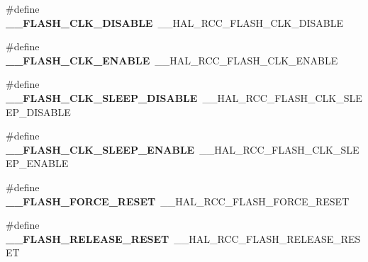 \begin{DoxyCompactItemize}
\item 
\#define {\bfseries \+\_\+\+\_\+\+F\+L\+A\+S\+H\+\_\+\+C\+L\+K\+\_\+\+D\+I\+S\+A\+B\+LE}~\+\_\+\+\_\+\+H\+A\+L\+\_\+\+R\+C\+C\+\_\+\+F\+L\+A\+S\+H\+\_\+\+C\+L\+K\+\_\+\+D\+I\+S\+A\+B\+LE\hypertarget{group___h_a_l___r_c_c___aliased_ga201486d4c60a085aae103a6e24686f79}{}\label{group___h_a_l___r_c_c___aliased_ga201486d4c60a085aae103a6e24686f79}

\item 
\#define {\bfseries \+\_\+\+\_\+\+F\+L\+A\+S\+H\+\_\+\+C\+L\+K\+\_\+\+E\+N\+A\+B\+LE}~\+\_\+\+\_\+\+H\+A\+L\+\_\+\+R\+C\+C\+\_\+\+F\+L\+A\+S\+H\+\_\+\+C\+L\+K\+\_\+\+E\+N\+A\+B\+LE\hypertarget{group___h_a_l___r_c_c___aliased_gaed751ca0ecff59ac600a0e37bb48595d}{}\label{group___h_a_l___r_c_c___aliased_gaed751ca0ecff59ac600a0e37bb48595d}

\item 
\#define {\bfseries \+\_\+\+\_\+\+F\+L\+A\+S\+H\+\_\+\+C\+L\+K\+\_\+\+S\+L\+E\+E\+P\+\_\+\+D\+I\+S\+A\+B\+LE}~\+\_\+\+\_\+\+H\+A\+L\+\_\+\+R\+C\+C\+\_\+\+F\+L\+A\+S\+H\+\_\+\+C\+L\+K\+\_\+\+S\+L\+E\+E\+P\+\_\+\+D\+I\+S\+A\+B\+LE\hypertarget{group___h_a_l___r_c_c___aliased_ga693fcefbe588aab88ed03b34cbd654a2}{}\label{group___h_a_l___r_c_c___aliased_ga693fcefbe588aab88ed03b34cbd654a2}

\item 
\#define {\bfseries \+\_\+\+\_\+\+F\+L\+A\+S\+H\+\_\+\+C\+L\+K\+\_\+\+S\+L\+E\+E\+P\+\_\+\+E\+N\+A\+B\+LE}~\+\_\+\+\_\+\+H\+A\+L\+\_\+\+R\+C\+C\+\_\+\+F\+L\+A\+S\+H\+\_\+\+C\+L\+K\+\_\+\+S\+L\+E\+E\+P\+\_\+\+E\+N\+A\+B\+LE\hypertarget{group___h_a_l___r_c_c___aliased_gaef4f7736b82351cdf009eb0a52443fc4}{}\label{group___h_a_l___r_c_c___aliased_gaef4f7736b82351cdf009eb0a52443fc4}

\item 
\#define {\bfseries \+\_\+\+\_\+\+F\+L\+A\+S\+H\+\_\+\+F\+O\+R\+C\+E\+\_\+\+R\+E\+S\+ET}~\+\_\+\+\_\+\+H\+A\+L\+\_\+\+R\+C\+C\+\_\+\+F\+L\+A\+S\+H\+\_\+\+F\+O\+R\+C\+E\+\_\+\+R\+E\+S\+ET\hypertarget{group___h_a_l___r_c_c___aliased_ga61f4844e1d6ead1201a1719955eaedac}{}\label{group___h_a_l___r_c_c___aliased_ga61f4844e1d6ead1201a1719955eaedac}

\item 
\#define {\bfseries \+\_\+\+\_\+\+F\+L\+A\+S\+H\+\_\+\+R\+E\+L\+E\+A\+S\+E\+\_\+\+R\+E\+S\+ET}~\+\_\+\+\_\+\+H\+A\+L\+\_\+\+R\+C\+C\+\_\+\+F\+L\+A\+S\+H\+\_\+\+R\+E\+L\+E\+A\+S\+E\+\_\+\+R\+E\+S\+ET\hypertarget{group___h_a_l___r_c_c___aliased_ga7911a352df6fda64eefb9078dd4689a5}{}\label{group___h_a_l___r_c_c___aliased_ga7911a352df6fda64eefb9078dd4689a5}


\end{DoxyCompactItemize}
